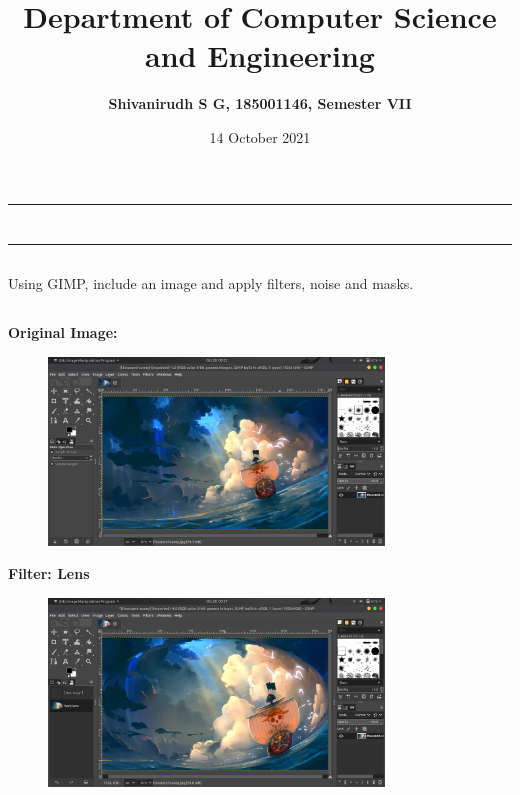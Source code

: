 \documentclass[9pt,letterpaper]{article}
\title{\textbf{Department of Computer Science and Engineering}}
\author{\textbf{Shivanirudh S G, 185001146, Semester VII }}
\date{14 October 2021}
\begin{document}
\maketitle
\hrule
\section*{}
\hrule 
\bigskip\bigskip

\subsection*{}

\subsection*{}
\begin{flushleft}
    Using GIMP, include an image and apply filters, noise and masks.
\end{flushleft}

\subsection*{}

\textbf{Original Image:}\\
\begin{figure}[h]
    \centering
    \includegraphics[height=5cm]{Outputs/OP1.png}
\end{figure}

\newpage
\textbf{Filter: Lens}\\
\begin{figure}[h]
    \centering
    \includegraphics[height=5cm]{Outputs/OP2.png}
\end{figure}
\end{document}
